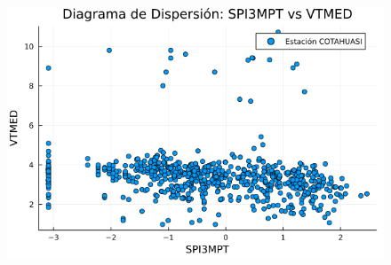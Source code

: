 \begin{figure}[htbp]
\begin{minipage}{0.32\textwidth}
    \includegraphics[width=\linewidth]{Capitulos/Scaterplot/COTAHUASI_SPI3MPT_vs_VTMED.png}
\end{minipage}

\vspace{0.5cm}  %


\end{figure}
